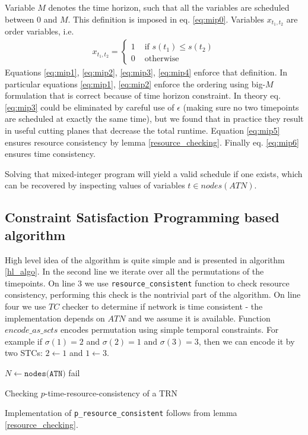 \documentclass{article}
\begin{document}
\begin{multicols}{2}
Variable $M$ denotes the time horizon, such that all the variables are scheduled between $0$ and $M$. This definition is imposed in eq. \ref{eq:mip0}.
Variables $x_{t_1,t_2}$ are order variables, i.e.
\begin{align*}
x_{t_1, t_2} = \begin{cases}
1 &\text{ if }s(t_1) \leq s(t_2) \\
0 &\text{ otherwise}
\end{cases}
\end{align*}
Equations \ref{eq:mip1}, \ref{eq:mip2}, \ref{eq:mip3}, \ref{eq:mip4} enforce that definition. In particular equations \ref{eq:mip1}, \ref{eq:mip2} enforce the ordering using big-$M$ formulation that is correct because of time horizon constraint. In theory eq. \ref{eq:mip3} could be eliminated by careful use of $\epsilon$ (making sure no two timepoints are scheduled at exactly the same time), but we found that in practice they result in useful cutting planes that decrease the total runtime. Equation \ref{eq:mip5} ensures resource consistency by lemma \ref{resource_checking}. Finally eq. \ref{eq:mip6} ensures time consistency.

Solving that mixed-integer program will yield a valid schedule if one exists, which can be recovered by inspecting values of variables $t \in nodes(ATN)$.

\subsection{Constraint Satisfaction Programming based algorithm}
High level idea of the algorithm is quite simple and is presented in algorithm \ref{hl_algo}. In the second line we iterate over all the permutations of the timepoints. On line 3 we use \texttt{resource\_consistent} function to check resource consistency, performing this check is the nontrivial part of the algorithm. On line four we use $TC$ checker to determine if network is time consistent - the implementation depends on $ATN$ and we assume it is available. Function $encode\_as\_scts$ encodes permutation using simple temporal constraints. For example if $\sigma(1) = 2$ and $\sigma(2) = 1$ and $\sigma(3) = 3$, then we can encode it by two STCs: $ 2 \leftarrow 1 $ and $1 \leftarrow 3$.

\begin{algorithm}[H]
    \label{hl_algo}
    $N \leftarrow \texttt{nodes(ATN)}$\;
    fail\;
    \caption{Checking $p$-time-resource-consistency of a TRN }
\end{algorithm}
Implementation of \texttt{p\_resource\_consistent} follows from lemma \ref{resource_checking}.




\end{multicols}
\end{document}
